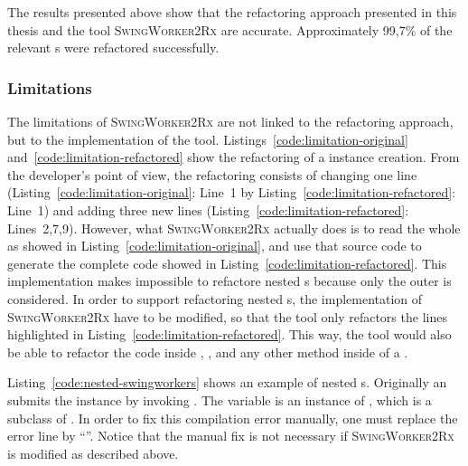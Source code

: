 \documentclass[type=bsc,accentcolor=tud9c]{tudthesis}
\newcommand{\toolextension}{\textsc{SwingWorker2Rx}}
\begin{document}
The results presented above show that the refactoring approach presented in this thesis and the tool \toolextension{} are accurate. Approximately 99,7\% of the  relevant s were refactored successfully.

\subsubsection{Limitations}
\label{sec:eval-limitations}

The limitations of \toolextension{} are not linked to the refactoring approach, but to the implementation of the tool. Listings~\ref{code:limitation-original} and~\ref{code:limitation-refactored} show the refactoring of a  instance creation. From the developer's point of view, the refactoring consists of changing one line (Listing~\ref{code:limitation-original}: Line~1 by Listing~\ref{code:limitation-refactored}: Line~1) and adding three new lines (Listing~\ref{code:limitation-refactored}: Lines~2,7,9). However, what \toolextension{} actually does is to read the whole  as showed in Listing~\ref{code:limitation-original}, and use that source code to generate the complete code showed in Listing~\ref{code:limitation-refactored}. This implementation makes impossible to refactore nested s because only the outer  is considered. In order to support refactoring nested s, the implementation of \toolextension{} have to be modified, so that the tool only refactors the lines highlighted in Listing~\ref{code:limitation-refactored}. This way, the tool would also be able to refactor the code inside , ,  and any other method inside of a .



Listing~\ref{code:nested-swingworkers} shows an example of nested s. Originally an  submits the instance  by invoking . The variable  is an instance of , which is a subclass of . In order to fix this compilation error manually, one must replace the error line by ``''. Notice that the manual fix is not necessary if \toolextension{} is modified as described above.


\end{document}
